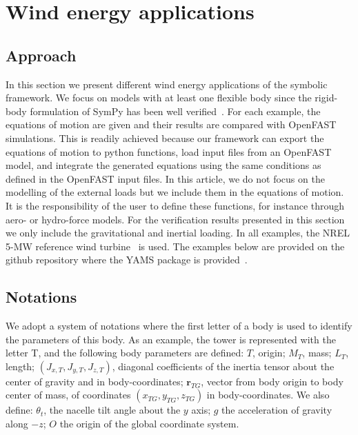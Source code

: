 \documentclass[wes, manuscript]{copernicus}
\renewcommand{\v}[1]{\boldsymbol{#1}}
\newcommand{\m}[1]{\boldsymbol{#1}}
\begin{document}




\section{Wind energy applications}
\label{sec:WEapplications}

\subsection{Approach}
In this section we present different wind energy applications of the symbolic framework. 
We focus on models with at least one flexible body since the rigid-body formulation of SymPy has been well verified~\citep{Gede:2013}.
For each example, the equations of motion are given and their results are compared with OpenFAST~\citep{openfast} simulations.
This is readily achieved because our framework can export the equations of motion to python functions, load input files from an OpenFAST model, and integrate the generated equations using the same conditions as defined in the OpenFAST input files. 
In this article, we do not focus on the modelling of the external loads but we include them in the equations of motion.
It is the responsibility of the user to define these functions, for instance through aero- or hydro-force models.
For the verification results presented in this section we only include the gravitational and inertial loading.
In all examples, the NREL 5-MW reference wind turbine~\citep{nrel5mw} is used.
The examples below are provided on the github repository where the YAMS package is provided~\citep{WELIBgithub}.

\subsection{Notations}
We adopt a system of notations where the first letter of a body is used to identify the parameters of this body.
    As an example, the tower is represented with the letter T, and the following body parameters are defined: $T$, origin; $M_T$, mass; $L_T$, length; $(J_{x,T}, J_{y,T}, J_{z,T})$, diagonal coefficients of the inertia tensor about the center of gravity and in body-coordinates; $\v{r}_{TG}$, vector from body origin to body center of mass, of coordinates $(x_{TG},y_{TG},z_{TG})$ in body-coordinates. 
We also define: $\theta_t$, the nacelle tilt angle about the $y$ axis; $g$ the acceleration of gravity along $-z$; $O$ the origin of the global coordinate system.
\end{document}

